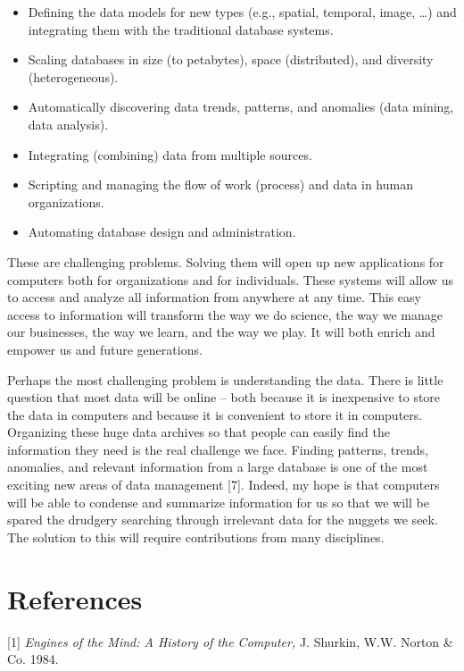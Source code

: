 \documentclass[a4paper,12pt,notitlepage,twoside,openright]{article}
\begin{document}
\begin{itemize}
\item
  Defining the data models for new types (e.g., spatial, temporal,
  image, \ldots) and integrating them with the traditional database
  systems.
\item
  Scaling databases in size (to petabytes), space (distributed), and
  diversity (heterogeneous).
\item
  Automatically discovering data trends, patterns, and anomalies (data
  mining, data analysis).
\item
  Integrating (combining) data from multiple sources.
\item
  Scripting and managing the flow of work (process) and data in human
  organizations.
\item
  Automating database design and administration.
\end{itemize}

These are challenging problems. Solving them will open up new
applications for computers both for organizations and for individuals.
These systems will allow us to access and analyze all information from
anywhere at any time. This easy access to information will transform the
way we do science, the way we manage our businesses, the way we learn,
and the way we play. It will both enrich and empower us and future
generations.

Perhaps the most challenging problem is understanding the data. There is
little question that most data will be online -- both because it is
inexpensive to store the data in computers and because it is convenient
to store it in computers. Organizing these huge data archives so that
people can easily find the information they need is the real challenge
we face. Finding patterns, trends, anomalies, and relevant information
from a large database is one of the most exciting new areas of data
management {[}7{]}. Indeed, my hope is that computers will be able to
condense and summarize information for us so that we will be spared the
drudgery searching through irrelevant data for the nuggets we seek. The
solution to this will require contributions from many disciplines.

\hypertarget{references}{%
\section{References}\label{references}}

{[}1{]} \emph{Engines of the Mind: A History of the Computer,} J.
Shurkin, W.W. Norton \& Co. 1984.
\end{document}
